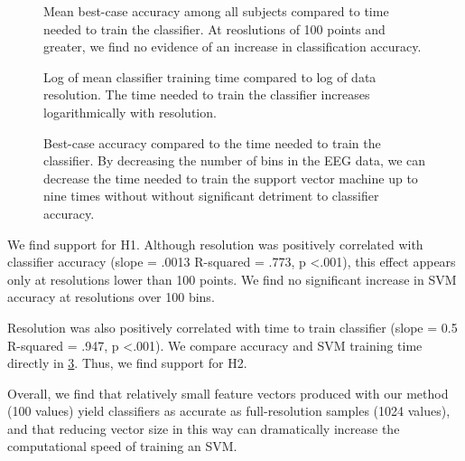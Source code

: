 \begin{figure}[!h]
  \vspace{-0.2cm}
  \centering
   {}
  \caption{Mean best-case accuracy among all subjects compared to time needed to train the classifier. At reoslutions of 100 points and greater, we find no evidence of an increase in classification accuracy. }
  \label{fig:fig1a}
  \vspace{-0.1cm}
 \end{figure}

 \begin{figure}[!h]
  \vspace{-0.2cm}
  \centering
   {}
  \caption{Log of mean classifier training time compared to log of data resolution. The time needed to train the classifier increases logarithmically with resolution.}
  \label{fig:fig1b}
  \vspace{-0.1cm}
 \end{figure}

\begin{figure}[!h]
  \vspace{-0.2cm}
  \centering
   {}
  \caption{ Best-case accuracy compared to the time needed to train the classifier. By decreasing the number of bins in the EEG data, we can decrease the time needed to train the support vector machine up to nine times without without significant detriment to classifier accuracy. }
  \label{fig:fig1c}
  \vspace{-0.1cm}
 \end{figure}


We find support for H1. Although resolution was positively correlated with classifier accuracy (slope = .0013 R-squared = .773, p \textless .001), this effect appears only at resolutions lower than 100 points. We find no significant increase in SVM accuracy at resolutions over 100 bins. 

Resolution was also positively correlated with time to train classifier (slope = 0.5 R-squared = .947, p \textless .001). We compare accuracy and SVM training time directly in \ref{fig:fig1c}. Thus, we find support for H2.

Overall, we find that relatively small feature vectors produced with our method (100 values) yield classifiers as accurate as full-resolution samples (1024 values), and that reducing vector size in this way can dramatically increase the computational speed of training an SVM. 

